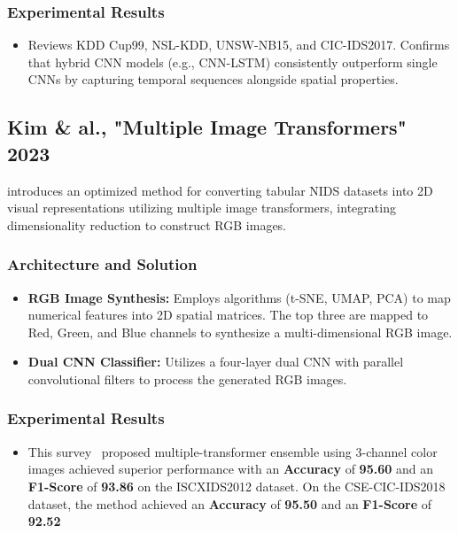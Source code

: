\documentclass[12pt, a4paper]{report}
\begin{document}
\subsubsection{Experimental Results}
\begin{itemize}
    \item Reviews KDD Cup99, NSL-KDD, UNSW-NB15, and CIC-IDS2017. Confirms that hybrid CNN models (e.g., CNN-LSTM) consistently outperform single CNNs by capturing temporal sequences alongside spatial properties. 
\end{itemize}

\subsection{Kim \& al., "Multiple Image Transformers" 2023}
\cite{kim2023deep} introduces an optimized method for converting tabular NIDS datasets into 2D visual representations utilizing multiple image transformers, integrating dimensionality reduction to construct RGB images.

\subsubsection{Architecture and Solution}
\begin{itemize}
    \item \textbf{RGB Image Synthesis:} Employs algorithms (t-SNE, UMAP, PCA) to map numerical features into 2D spatial matrices. The top three are mapped to Red, Green, and Blue channels to synthesize a multi-dimensional RGB image.
    \item \textbf{Dual CNN Classifier:} Utilizes a four-layer dual CNN with parallel convolutional filters to process the generated RGB images.
\end{itemize}

\subsubsection{Experimental Results}
\begin{itemize}
    \item This survey \ proposed multiple-transformer ensemble using 3-channel color images achieved superior performance with an \textbf{Accuracy} of \textbf{95.60} and an \textbf{F1-Score} of \textbf{93.86} on the ISCXIDS2012 dataset. On the CSE-CIC-IDS2018 dataset, the method achieved an \textbf{Accuracy} of \textbf{95.50} and an \textbf{F1-Score} of \textbf{92.52} 
\end{itemize}
\end{document}

